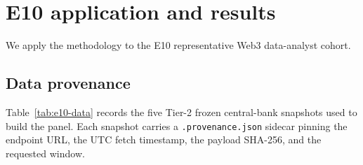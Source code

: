 \documentclass[11pt,letterpaper]{article}
\theoremstyle{assumption}
\begin{document}
\section{E10 application and results}
\label{sec:e10-results}

We apply the methodology to the E10 representative Web3 data-analyst cohort.

\subsection{Data provenance}
\label{sec:e10-data}

Table~\ref{tab:e10-data} records the five Tier-2 frozen central-bank
snapshots used to build the panel. Each snapshot carries a
\texttt{.provenance.json} sidecar pinning the endpoint URL, the UTC fetch
timestamp, the payload SHA-256, and the requested window.

\begin{table}[h]
\centering
\caption{E10 GSPS panel --- Tier-2 frozen central-bank FX sources
  (re-verified per-currency at the data-visibility gate, 2026-05-20).}
\label{tab:e10-data}
\footnotesize
{}
\\[0.3em]
\caption*{\footnotesize Window: 2023-11-01 to 2026-04-30 (30 calendar
months; 150 panel cells). NGN is confined to the post-June-2023 float
regime; all in-window rows fall inside the post-NFEM float so confinement
does not shorten the panel. ZAR, KES, GHS were dropped at the
data-visibility gate (no free machine-readable daily $\sim$30-month
central-bank series); they are not substituted. The x402 per-query price
$p = \$0.01$ USDC was re-verified live at the data-visibility gate against
The Graph Gateway x402 \texttt{payment-required} header.}
\end{table}
\end{document}
